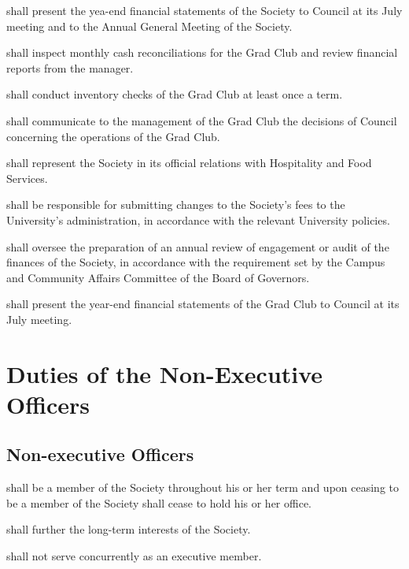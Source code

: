 \begin{longenum}[ label*=\arabic*., align=left]
    \item shall present the yea-end financial statements of the Society to Council at its July meeting and to the Annual General Meeting of the Society.
    \item shall inspect monthly cash reconciliations for the Grad Club and review financial reports from the manager.
    \item shall conduct inventory checks of the Grad Club at least once a term.
    \item shall communicate to the management of the Grad Club the decisions of Council concerning the operations of the Grad Club.
    \item shall represent the Society in its official relations with Hospitality and Food Services.
    \item shall be responsible for submitting changes to the Society's fees to the University's administration, in accordance with the relevant University policies.
    \item shall oversee the preparation of an annual review of engagement or audit of the finances of the Society, in accordance with the requirement set by the Campus and Community Affairs Committee of the Board of Governors.
    \item shall present the year-end financial statements of the Grad Club to Council at its July meeting. 
\end{longenum}

\newpage

\section{Duties of the Non-Executive Officers}
\subsection {Non-executive Officers} 
\begin{longenum}[ label*=\thesubsection.\arabic*., align=left]
	\item shall be a member of the Society throughout his or her term and upon ceasing to be a member of the Society shall cease to hold his or her office.
	\item shall further the long-term interests of the Society.
    \item shall not serve concurrently as an executive member.
\end{longenum}
